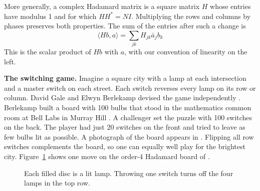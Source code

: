 \documentclass[11pt,a4paper]{article}
\theoremstyle{remark}
\begin{document}
More generally, a complex Hadamard matrix is a square matrix $H$ whose
entries have modulus 1 and for which $HH^*=NI$. Multiplying the rows
and columns by phases preserves both properties. The sum of the entries
after such a change is
\[
   \langle Hb,a\rangle=\sum_{jk}H_{jk}\bar a_jb_k
\]
This is the scalar product of $Hb$ with $a$, with our convention of linearity on the left.

\medskip
\noindent\textbf{The switching game.}
Imagine a square city with a lamp at each intersection and a master switch on
each street. Each switch reverses every lamp on its row or column.
David Gale and Elwyn Berlekamp devised the game independently \cite{kas}.
Berlekamp built a board with 100 bulbs that stood in the mathematics
common room at Bell Labs in Murray Hill \cite{slo}. A challenger set the puzzle
with 100 switches on the back. The player had just 20 switches on the front
and tried to leave as few bulbs lit as possible. A photograph of the board
appears in \cite[Plate~1]{fsl}. Flipping all row switches complements the board,
so one can equally well play for the brightest city.
Figure~\ref{fig:lamps} shows one move on the order-4 Hadamard board of \cite{banica}.

\begin{figure}[htb!]
\centering
{}
\caption{Each filled disc is a lit lamp. Throwing one switch turns off the
four lamps in the top row.}\label{fig:lamps}
\end{figure}
\end{document}
